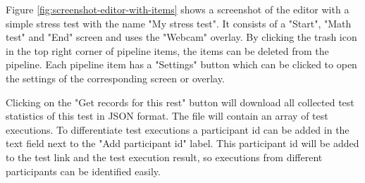 Figure \ref{fig:screenshot-editor-with-items} shows a screenshot of the editor with a simple stress test with the name "My stress test".
It consists of a "Start", "Math test" and "End" screen and uses the "Webcam" overlay.
By clicking the trash icon in the top right corner of pipeline items, the items can be deleted from the pipeline.
Each pipeline item has a "Settings" button which can be clicked to open the settings of the corresponding screen or overlay.

Clicking on the "Get records for this rest" button will download all collected test statistics of this test in JSON format.
The file will contain an array of test executions.
To differentiate test executions a participant id can be added in the text field next to the "Add participant id" label.
This participant id will be added to the test link and the test execution result, so executions from different participants can be identified easily.
